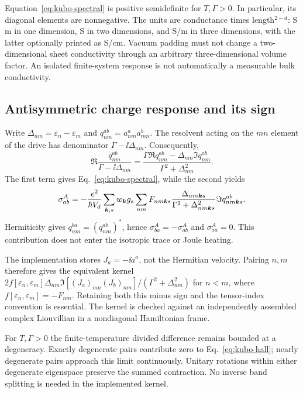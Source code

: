 Equation~\eqref{eq:kubo-spectral} is positive semidefinite for
$T,\Gamma>0$. In particular, its diagonal elements are nonnegative.
The units are conductance times length$^{2-d}$: S\,m in one dimension,
S in two dimensions, and S/m in three dimensions, with the latter
optionally printed as S/cm. Vacuum padding must not change a
two-dimensional sheet conductivity through an arbitrary three-dimensional
volume factor. An isolated finite-system response is not automatically
a measurable bulk conductivity.

\subsection{Antisymmetric charge response and its sign}
Write $\Delta_{nm}=\varepsilon_n-\varepsilon_m$ and
$q^{ab}_{nm}=a^a_{nm}a^b_{mn}$. The resolvent acting on the
$mn$ element of the drive has denominator $\Gamma-\ii\Delta_{nm}$.
Consequently,
\begin{equation}
 \Re\frac{q^{ab}_{nm}}{\Gamma-\ii\Delta_{nm}}
 =\frac{\Gamma\Re q^{ab}_{nm}-\Delta_{nm}\Im q^{ab}_{nm}}
 {\Gamma^2+\Delta_{nm}^2}.
 \label{eq:kubo-complex-weight}
\end{equation}
The first term gives Eq.~\eqref{eq:kubo-spectral}, while the second yields
\begin{equation}
 \sigma^A_{ab}=-\frac{e^2}{\hbar V_d}
 \sum_{\bm{k},s}w_{\bm{k}}g_s\sum_{nm}
 F_{nm\bm{k} s}\frac{\Delta_{nm\bm{k} s}}
 {\Gamma^2+\Delta_{nm\bm{k} s}^2}\Im q^{ab}_{nm\bm{k} s}.
 \label{eq:kubo-hall}
\end{equation}
Hermiticity gives $q^{ba}_{nm}=(q^{ab}_{nm})^*$, hence
$\sigma^A_{ba}=-\sigma^A_{ab}$ and $\sigma^A_{aa}=0$.
This contribution does not enter the isotropic trace or Joule heating.

The implementation stores $J_a=-\ii a^a$, not the Hermitian velocity.
Pairing $n,m$ therefore gives the equivalent kernel
$2f[\varepsilon_n,\varepsilon_m]\Delta_{nm}
\Im[(J_a)_{mn}(J_b)_{nm}]/(\Gamma^2+\Delta_{nm}^2)$ for $n<m$,
where $f[\varepsilon_n,\varepsilon_m]=-F_{nm}$.
Retaining both this minus sign and the tensor-index convention is
essential. The kernel is checked against an independently assembled
complex Liouvillian in a nondiagonal Hamiltonian frame.

For $T,\Gamma>0$ the finite-temperature divided difference remains
bounded at a degeneracy. Exactly degenerate pairs contribute zero to
Eq.~\eqref{eq:kubo-hall}; nearly degenerate pairs approach this limit
continuously. Unitary rotations within either degenerate eigenspace
preserve the summed contraction. No inverse band splitting is needed
in the implemented kernel.

